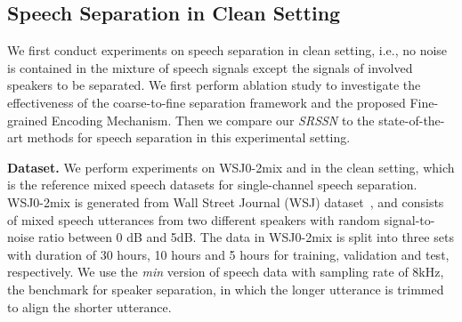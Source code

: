 \subsection{Speech Separation in Clean Setting}
\label{ssec:sep_clean}
We first conduct experiments on speech separation in clean setting, i.e., no noise is contained in the mixture of speech signals except the signals of involved speakers to be separated. We first perform ablation study to investigate the effectiveness of the coarse-to-fine separation framework and the proposed Fine-grained Encoding Mechanism. Then we compare our \emph{SRSSN} to the state-of-the-art methods for speech separation in this experimental setting.

\noindent\textbf{Dataset.} 
We perform experiments on WSJ0-2mix and  in the clean setting, which is the reference mixed speech datasets for single-channel speech separation. WSJ0-2mix is generated from Wall Street Journal (WSJ) dataset~\cite{wsj0}, and consists of mixed speech utterances from two different speakers with random signal-to-noise ratio between 0 dB and 5dB. The data in WSJ0-2mix is split into three sets with duration of 30 hours, 10 hours and 5 hours for training, validation and test, respectively. 
We use the \textit{min} version of speech data with sampling rate of 8kHz, the benchmark for speaker separation, in which the longer utterance is trimmed to align the shorter utterance.

\begin{comment}
\begin{figure}[b]
\begin{minipage}[b]{0.43\linewidth}
    \centering
    \centerline{\texttt{[image: bar\_SI-SNR]}}
    \centerline{(a) Performance in SI-SNRi.}\medskip
  \end{minipage}
  \hspace{0.02\linewidth}
  \begin{minipage}[b]{0.43\linewidth}
    \centering
    \centerline{\texttt{[image: bar\_SDR]}}
    \centerline{(b) Performance in SDRi.}\medskip
  \end{minipage}
\caption{Performance of four variants of our SRSSN in terms of SI-SNRi and SDRi for ablation study.  is the number of DPRNN blocks in both coarse and refining separators.}
\label{fig:ablation}
\end{figure}
\end{comment}







